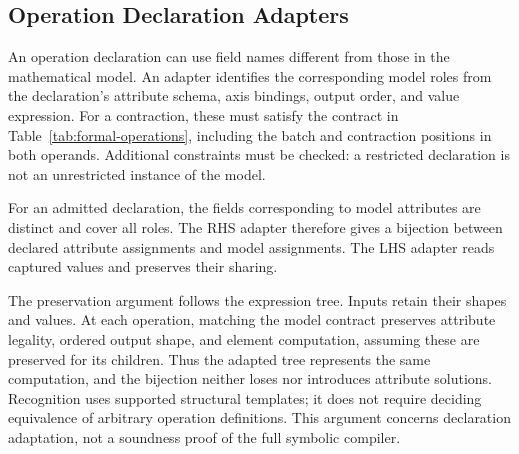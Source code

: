 \subsection{Operation Declaration Adapters}
\label{sec:declaration-adapters}
An operation declaration can use field names different from those in the
mathematical model. An adapter identifies the corresponding model roles
from the declaration's attribute schema, axis bindings, output order, and
value expression. For a contraction, these must satisfy the contract in
Table~\ref{tab:formal-operations}, including the batch and contraction
positions in both operands. Additional constraints must be checked: a
restricted declaration is not an unrestricted instance of the model.

For an admitted declaration, the fields corresponding to model attributes
are distinct and cover all roles. The RHS adapter therefore gives a
bijection between declared attribute assignments and model assignments.
The LHS adapter reads captured values and preserves their sharing.

The preservation argument follows the expression tree. Inputs retain their
shapes and values. At each operation, matching the model contract preserves
attribute legality, ordered output shape, and element computation, assuming
these are preserved for its children. Thus the adapted tree represents the
same computation, and the bijection neither loses nor introduces attribute
solutions. Recognition uses supported structural templates; it does not
require deciding equivalence of arbitrary operation definitions. This
argument concerns declaration adaptation, not a soundness proof of the
full symbolic compiler.
